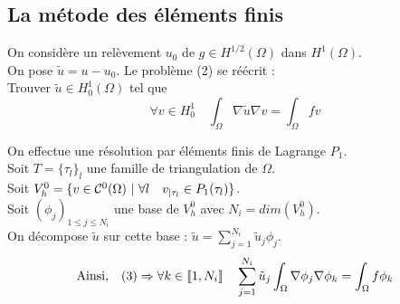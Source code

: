 \documentclass[10pt]{beamer}
\begin{document}
\subsection{La métode des éléments finis}

	\begin{frame}
	
		\vspace*{33pt}
		On considère un relèvement $u_0$ de $g \in H^{1/2}(\Omega)$ dans $H^{1}(\Omega)$. \\
		On pose $\tilde{u} = u-u_0$. Le problème (2) se réécrit : \\
		\vspace*{11pt}
		Trouver $\tilde{u} \in H^{1}_{0}(\Omega)$ tel que
		\begin{equation}
		\forall v \in H^{1}_{0} \quad \int_{\Omega}{\nabla \tilde{u}}{\nabla v} = \int_{\Omega}{fv}
		\end{equation}

		On effectue une résolution par éléments finis de Lagrange $P_1$.\\
		Soit $T = \{\tau_l\}_l$ une famille de triangulation de $\Omega$.\\
		Soit $V_h^{0} = \{v \in \mathcal{C}^{0}(\Omega) \text{ | } \forall l \quad v_{|\tau_l} \in P_1(\tau_l) \}$.\\
		Soit $(\phi_j)_{1 \le j \le N_i}$ une base de $V_h^{0}$ avec $N_i=dim(V_h^{0})$.  \\
		\vspace*{11pt}
		On décompose $\tilde{u}$ sur cette base :  $\tilde{u} = \sum_{j=1}^{N_i}{\tilde{u}_j\phi_j}$. \\

		\begin{equation}
		\text{Ainsi,} \quad (3) \Rightarrow \forall k \in  \llbracket 1,N_i \rrbracket  \quad \sum_{j=1}^{N_i}{\tilde{u}_j\int_{\Omega}{\nabla \phi_j \nabla \phi_k}} = \int_{\Omega}{f\phi_k}
		\end{equation}

	\end{frame}
\end{document}
